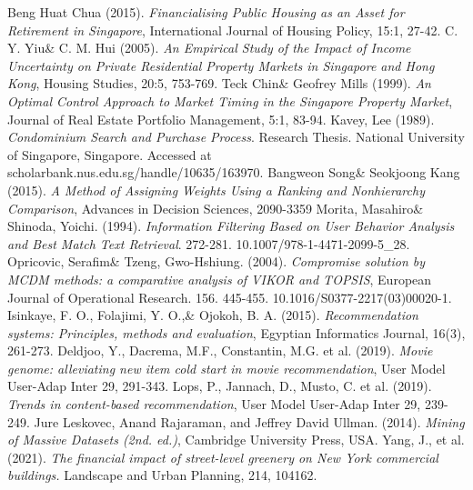\documentclass[a4paper, 11pt]{article}
\begin{document}
	\begin{thebibliography}{00} \footnotesize
		Beng Huat Chua (2015). \textit{Financialising Public Housing as an Asset for Retirement in Singapore}, International Journal of Housing Policy, 15:1, 27-42.
		 C. Y. Yiu\& C. M. Hui (2005). \textit{An Empirical Study of the Impact of Income Uncertainty on Private Residential Property Markets in Singapore and Hong Kong}, Housing Studies, 20:5, 753-769.
		 Teck Chin\& Geofrey Mills (1999). \textit{An Optimal Control Approach to Market Timing in the Singapore Property Market}, Journal of Real Estate Portfolio Management, 5:1, 83-94.
		 Kavey, Lee (1989). \textit{Condominium Search and Purchase Process}. Research Thesis. National University of Singapore, Singapore. Accessed at scholarbank.nus.edu.sg/handle/10635/163970.
		 Bangweon Song\& Seokjoong Kang (2015). \textit{A Method of Assigning Weights Using a Ranking and Nonhierarchy Comparison}, Advances in Decision Sciences, 2090-3359
		 Morita, Masahiro\& Shinoda, Yoichi. (1994). \textit{Information Filtering Based on User Behavior Analysis and Best Match Text Retrieval}. 272-281. 10.1007/978-1-4471-2099-5\_28.
		 Opricovic, Serafim\& Tzeng, Gwo-Hshiung. (2004). \textit{Compromise solution by MCDM methods: a comparative analysis of VIKOR and TOPSIS}, European Journal of Operational Research. 156. 445-455. 10.1016/S0377-2217(03)00020-1. 
		 Isinkaye, F. O., Folajimi, Y. O.,\& Ojokoh, B. A. (2015). \textit{Recommendation systems: Principles, methods and evaluation}, Egyptian Informatics Journal, 16(3), 261-273.
		 Deldjoo, Y., Dacrema, M.F., Constantin, M.G. et al. (2019). \textit{Movie genome: alleviating new item cold start in movie recommendation}, User Model User-Adap Inter 29, 291-343.
		 Lops, P., Jannach, D., Musto, C. et al. (2019). \textit{Trends in content-based recommendation}, User Model User-Adap Inter 29, 239-249.
		 Jure Leskovec, Anand Rajaraman, and Jeffrey David Ullman. (2014). \textit{Mining of Massive Datasets (2nd. ed.)}, Cambridge University Press, USA.
		 Yang, J., et al. (2021). \textit{The financial impact of street-level greenery on New York commercial buildings.} Landscape and Urban Planning, 214, 104162.

	\end{thebibliography}
\end{document}
